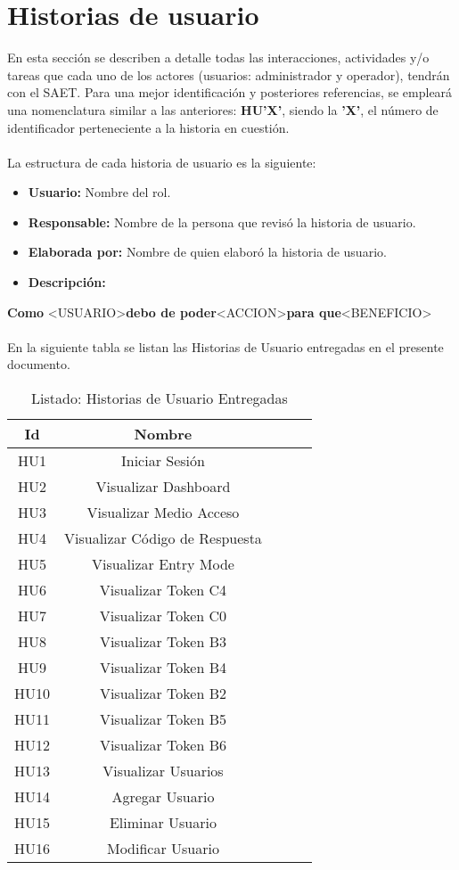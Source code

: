 \section{Historias de usuario}
En esta sección se describen a detalle todas las interacciones, actividades y/o tareas que cada uno de los actores (usuarios: administrador y operador), tendrán con el SAET. Para una mejor identificación y posteriores referencias, se empleará una nomenclatura similar a las anteriores: \textbf{HU'X'}, siendo la \textbf{'X'}, el número de identificador perteneciente a la historia en cuestión.
\\ \\
La estructura de cada historia de usuario es la siguiente: 
\begin{itemize}
	\item \textbf{Usuario:} Nombre del rol.
	\item \textbf{Responsable:} Nombre de la persona que revisó la historia de usuario.
	\item \textbf{Elaborada por:} Nombre de quien elaboró la historia de usuario.
	\item \textbf{Descripción:}
\end{itemize}
	\textbf{Como} \textless USUARIO\textgreater \textbf{debo de poder}\textless ACCION\textgreater \textbf{para que}\textless BENEFICIO\textgreater
	\\ \\
En la siguiente tabla se listan las Historias de Usuario entregadas en el presente documento.
\begin{table}[h]
	\begin{center}
		\begin{tabular}{|c|c|c|c|c|}
			\hline 
			\textbf{Id} & \textbf{Nombre} \\ 
			\hline 
			HU1 & Iniciar Sesión \\
			HU2 & Visualizar Dashboard \\
			HU3 & Visualizar Medio Acceso \\
			HU4 & Visualizar Código de Respuesta \\
			HU5 & Visualizar Entry Mode \\
			HU6 & Visualizar Token C4 \\
			HU7 & Visualizar Token C0 \\
			HU8 & Visualizar Token B3 \\
			HU9 & Visualizar Token B4 \\
			HU10 & Visualizar Token B2 \\
			HU11 & Visualizar Token B5 \\
			HU12 & Visualizar Token B6 \\
			HU13 & Visualizar Usuarios \\
			HU14 & Agregar Usuario \\
			HU15 & Eliminar Usuario \\
			HU16 & Modificar Usuario \\
			\hline 
		\end{tabular}
	\end{center}
	\caption{Listado: Historias de Usuario Entregadas}
\end{table}
